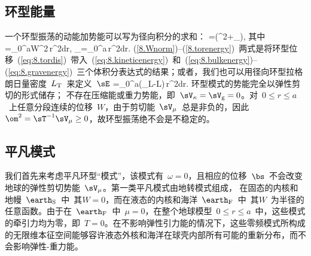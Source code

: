 \subsection{环型能量}
%
%
\label{section:toroidalenergy}

一个环型振荡的动能加势能可以写为径向积分的求和：
\eq \label{8.TOTOREN}
\sE=\half(\om^2\sT+\sV_{\mu}),
\en
其中
%
%
\eq \label{8.Wnorm}
\sT=\int_0^a\rho W^2\,r^2dr,
\en
{}%
%
\eq \label{8.torenergy}
\sV_{\mu}=\int_0^a\mu
[(\dW-r^{-1}W)^2+(k^2-2)r^{-2}W^2]\,r^2dr.
\en
(\ref{8.Wnorm})--(\ref{8.torenergy})~两式是将环型位移~(\ref{eq:8.tordis})~带入~(\ref{eq:8.kineticenergy})~和~(\ref{eq:8.bulkenergy})--(\ref{eq:8.gravenergy})~三个体积分表达式的结果；或者，我们也可以用径向环型拉格朗日量密度~$L_{\rm T}$~来定义~$\sE$
\eq \label{8.torEL}
\sE=\int_0^a(\omega\p_\omega L-L)\,r^2dr.
\en
环型模式的势能完全以弹性剪切的形式储存；
%
%
不存在压缩能或重力势能，即~$\sV_{\kappa}=\sV_{\rm g}=0$。对~$0\leq r\leq a$~上任意分段连续的位移~$W$，由于剪切能~$\sV_{\mu}$~总是非负的，因此$\om^2=\sT^{-1}\sV_{\mu}\geq 0$，故环型振荡绝不会是不稳定的。
%
%
%

\renewcommand{\thesubsection}{$\!\!\!\raise1.3ex\hbox{$\star$}\!\!$
\arabic{chapter}.\arabic{section}.\arabic{subsection}}
\subsection{平凡模式}
%
%
\label{sec:8.finrot}
\renewcommand{\thesubsection}{\arabic{chapter}.\arabic{section}.\arabic{subsection}}

我们首先来考虑平凡环型“模式”，该模式有~$\omega=0$，且相应的位移~$\bs$~不会改变地球的弹性剪切势能~$\sV_{\mu}$。第一类平凡模式由地转模式组成，
%
%
在固态的内核和地幔~$\earth_{\rm S}$~中~其$W=0$，而在液态的内核和海洋~$\earth_{\rm F}$~中~其$W$~为半径的任意函数。由于在~$\earth_{\rm F}$~中~$\mu=0$，在整个地球模型~$0\leq r\leq a$~中，这些模式的牵引力均为零，即~$T=0$。在不影响弹性引力能的情况下，这些零频模式所构成的无限维本征空间能够容许液态外核和海洋在球壳内部所有可能的重新分布，而不会影响弹性-重力能。

